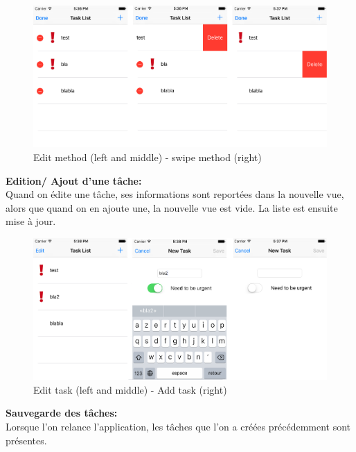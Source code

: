 \begin{figure}[H]
	\begin{center}
		\includegraphics[width=16.5cm]{img/cas1_01.png}
		\caption{Edit method (left and middle) - swipe method (right)}
		\label{vues1}
	\end{center}
\end{figure}

\textbf{Edition/ Ajout d'une tâche:}\\
Quand on édite une tâche, ses informations sont reportées dans la nouvelle vue, alors que quand on en ajoute une, la nouvelle vue est vide. La liste est ensuite mise à jour.

\begin{figure}[H]
	\begin{center}
		\includegraphics[width=16.5cm]{img/cas1_02.png}
		\caption{Edit task (left and middle) - Add task (right)}
		\label{vues2}
	\end{center}
\end{figure}

\textbf{Sauvegarde des tâches:}\\
Lorsque l'on relance l'application, les tâches que l'on a créées précédemment sont présentes.

